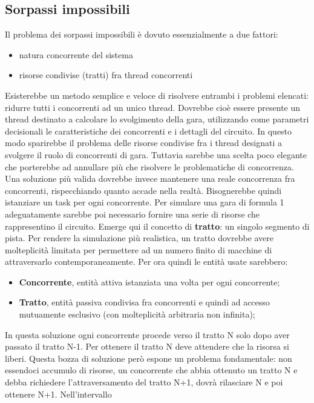 \subsection{Sorpassi impossibili}
Il problema dei sorpassi impossibili è dovuto essenzialmente a due fattori:
\begin{itemize}
\item natura concorrente del sistema
\item risorse condivise (tratti) fra thread concorrenti
\end{itemize}
Esisterebbe un metodo semplice e veloce di risolvere entrambi i problemi elencati: ridurre tutti i concorrenti ad un unico thread.
Dovrebbe cioè essere presente un thread destinato a calcolare lo svolgimento della gara, utilizzando come  parametri decisionali
le caratteristiche dei concorrenti e i dettagli del circuito. In questo modo sparirebbe il problema delle risorse condivise fra
i thread designati a svolgere il ruolo di concorrenti di gara. Tuttavia sarebbe una scelta poco elegante che porterebbe
ad annullare più che risolvere le problematiche di concorrenza.\\
Una soluzione più valida dovrebbe invece mantenere una reale concorrenza fra concorrenti, rispecchiando quanto accade nella realtà.
Bisognerebbe quindi istanziare un task per ogni concorrente. Per simulare una gara di formula 1 adeguatamente sarebbe poi necessario
fornire una serie di risorse che rappresentino il circuito. Emerge qui il concetto di \textbf{tratto}: un singolo segmento di pista.
Per rendere la simulazione più realistica, un tratto dovrebbe avere molteplicità limitata per permettere ad un numero finito di macchine
di attraversarlo contemporaneamente. Per ora quindi le entità usate sarebbero:
\begin{itemize}
\item \textbf{Concorrente}, entità attiva istanziata una volta per ogni concorrente;
\item \textbf{Tratto}, entità passiva condivisa fra concorrenti e quindi ad accesso mutuamente esclusivo (con molteplicità arbitraria non infinita);
\end{itemize}
In questa soluzione ogni concorrente procede verso il tratto N solo dopo aver passato il tratto N-1. Per ottenere il tratto N deve attendere
che la risorsa si liberi. Questa bozza di soluzione però espone un problema fondamentale: non essendoci accumulo di risorse,
un concorrente che abbia ottenuto un tratto N e debba richiedere l'attraversamento del tratto N+1, dovrà rilasciare N e poi ottenere N+1. Nell'intervallo
